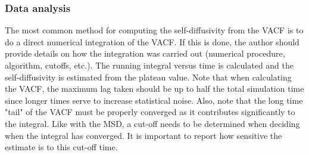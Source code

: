 \documentclass[9pt,bestpractices]{livecoms}
\begin{document}
\subsubsection{Data analysis} \label{sec:Self-Diffusivity:Green-Kubo: Data analysis}

The most common method for computing the self-diffusivity from the VACF is to do a direct numerical integration of the VACF. If this is done, the author should provide details on how the integration was carried out (numerical procedure, algorithm, cutoffs, etc.). The running integral versus time is calculated and the self-diffusivity is estimated from the plateau value. Note that when calculating the VACF, the maximum lag taken should be up to half the total simulation time since longer times serve to increase statistical noise. Also, note that the long time "tail" of the VACF must be properly converged as it contributes significantly to the integral. Like with the MSD, a cut-off needs to be determined when deciding when the integral has converged. It is important to report how sensitive the estimate is to this cut-off time. 

%
\end{document}
